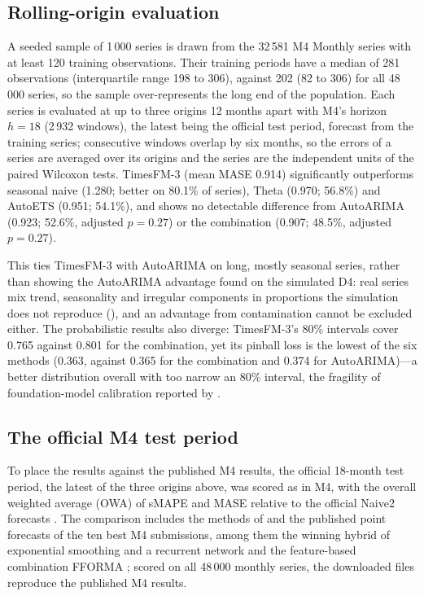 \subsection{Rolling-origin evaluation}
\label{sec:m4results}

A seeded sample of 1\,000 series is drawn from the 32\,581 M4 Monthly series with at least 120 training
observations. Their training periods have a median of
281 observations (interquartile range 198 to 306), against 202 (82 to 306) for all 48\,000 series, so the
sample over-represents the long end of the population. Each series is evaluated at up to three origins 12 months apart with M4's horizon $h = 18$ (2\,932
windows), the latest being the official test period, forecast from the training series; consecutive windows overlap by six months, so the
errors of a series are averaged over its origins and the series are the independent units of the paired
Wilcoxon tests. TimesFM-3 (mean MASE 0.914) significantly outperforms seasonal naive (1.280; better on 80.1\%
of series), Theta (0.970; 56.8\%) and AutoETS (0.951; 54.1\%), and shows no detectable difference from
AutoARIMA (0.923; 52.6\%, adjusted $p = 0.27$) or the combination (0.907; 48.5\%, adjusted $p = 0.27$).

This ties TimesFM-3 with AutoARIMA on long, mostly seasonal series, rather than showing the AutoARIMA
advantage found on the simulated D4: real series mix trend, seasonality and irregular components in
proportions the simulation does not reproduce (), and an advantage from
contamination cannot be excluded either. The probabilistic results also diverge: TimesFM-3's 80\% intervals
cover 0.765 against 0.801 for the combination, yet its pinball loss is the lowest of the six methods (0.363,
against 0.365 for the combination and 0.374 for AutoARIMA)---a better distribution overall with too narrow an
80\% interval, the fragility of foundation-model calibration reported by \citet{adler2026calibrated}.

\subsection{The official M4 test period}
\label{sec:m4official}

To place the results against the published M4 results, the official 18-month test period, the latest of
the three origins above, was scored as in M4, with the overall weighted average (OWA) of sMAPE and MASE relative to the official Naive2 forecasts
\citep{makridakis2020m4}. The comparison includes the methods of  and the
published point forecasts of the ten best M4 submissions, among them the winning hybrid of exponential
smoothing and a recurrent network \citep{smyl2020hybrid} and the feature-based combination FFORMA
\citep{monteromanso2020fforma}; scored on all 48\,000 monthly series, the downloaded files reproduce the
published M4 results.

